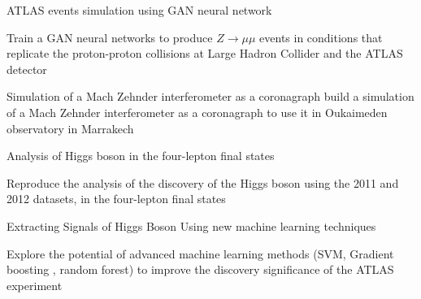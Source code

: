 


\begin{cventries}

      \cventry
      {ATLAS events simulation using  GAN neural network} %
    { } %
    {} %
    {} %
    {
      \begin{cvitems} %
        \item {Train a GAN neural networks to produce  $Z \to \mu \mu$  events in conditions that replicate the proton-proton collisions at Large Hadron Collider and the ATLAS detector}
        \end{cvitems}
    }
    
          \cvproject
      {Simulation of a Mach Zehnder interferometer as a coronagraph} %
    {} %
      {build a simulation of a Mach Zehnder interferometer as a coronagraph to use it in Oukaimeden observatory in Marrakech}

  \cventry
      {Analysis of Higgs boson in the four-lepton final states} %
    {} %
    {} %
    {} %
    {
      \begin{cvitems} %
        \item {Reproduce the analysis of the discovery of the Higgs boson using the 2011 and 2012 datasets, in the four-lepton final states}
        \end{cvitems}
    }
      \cventry
      {Extracting Signals of Higgs Boson Using new  machine learning techniques } %
    { } %
    {} %
    {} %
    {
      \begin{cvitems} %
        \item {Explore the potential of advanced machine learning methods (SVM, Gradient boosting , random forest) to improve the discovery significance of the ATLAS experiment}
        \end{cvitems}
    }
    

\end{cventries}
